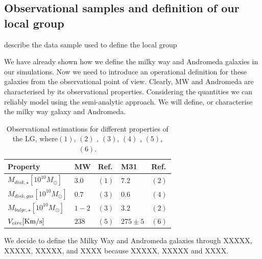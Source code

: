 \documentclass[useAMS,usenatbib]{mn2e}
\begin{document}
\subsection{Observational samples and definition of our local group}
\label{sec:LGdefine}

describe the data sample used to define the local group

We have already shown how we define the milky way and Andromeda
galaxies in our simulations. Now we need to introduce an operational
definition for these galaxies from the observational point of
view. Clearly, MW and Andromeda are characterised by its observational
properties. Considering the quantities we can reliably model using the
semi-analytic approach. We will define, or characterise the milky way
galaxy and Andromeda.\\

\begin{table}
\centering
\begin{tabular}{|l|l|l|l|l|}
\hline
\hline
 Property &  MW &  Ref. & M31 & Ref.\\
\hline
$M_{disk,\star}[10^{10}M_{\odot}]$ & $3.0 $ &  $(1)$ & $7.2$ & $(2)$ \\
$M_{disk,gas}[10^{10}M_{\odot}]$ & $0.7$ &  $(3)$ & $0.6$ &  $(4)$ \\
$M_{bulge,\star}[10^{10}M_{\odot}]$ & $1-2$ & $(3)$ & $3.2$ &  $(2)$ \\
$V_{circ}[{\rm Km/s}]$ & $238$ &  $(5)$ & $275\pm 5$ & $(6)$ \\
\hline
\hline
\end{tabular}
\caption{Observational estimations for different properties of the LG, where$(1)$\citet{2001ApJ...555..393Z},
$(2)$ \citet{2006MNRAS.366..996G}, $(3)$\citet{2009A&A...505..497Y}, $(4)$ \citet{2006A&A...453..459N}, $(5)$\citet{2005MNRAS.364..433B}, 
$(6)$\citet{2008MNRAS.389.1911S}.
}
\label{tab:lg-observations}
\end{table}


We decide to define the Milky Way and Andromeda galaxies through
XXXXX, XXXXX, XXXXX, and XXXX because XXXXX, XXXXX and XXXX.
\end{document}
